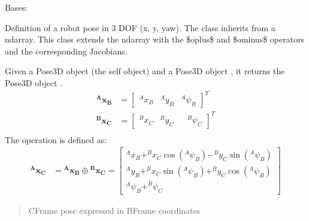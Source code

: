 \documentclass[letterpaper,10pt,english]{sphinxmanual}
\begin{document}
\begin{fulllineitems}
\label{\detokenize{compounding:Pose3D.Pose3D}}
\pysigstartsignatures
{}
\pysigstopsignatures
\sphinxAtStartPar
Bases: 

\sphinxAtStartPar
Definition of a robot pose in 3 DOF (x, y, yaw). The class inherits from a ndarray.
This class extends the ndarray with the \$oplus\$ and \$ominus\$ operators and the corresponding Jacobians.

\begin{fulllineitems}
\label{\detokenize{compounding:Pose3D.Pose3D.oplus}}
\pysigstartsignatures
{}
\pysigstopsignatures
\sphinxAtStartPar
Given a Pose3D object  (the self object) and a Pose3D object , it returns the Pose3D object .
\begin{equation*}
\begin{split}\mathbf{{^A}x_B} &= \begin{bmatrix} ^Ax_B & ^Ay_B & ^A\psi_B \end{bmatrix}^T \\
\mathbf{{^B}x_C} &= \begin{bmatrix} ^Bx_C & ^By_C & & ^B\psi_C \end{bmatrix}^T \\\end{split}
\end{equation*}
\sphinxAtStartPar
The operation is defined as:
\begin{equation}\label{equation:compounding:eq-oplus3dof}
\begin{split}\mathbf{{^A}x_C} &= \mathbf{{^A}x_B} \oplus \mathbf{{^B}x_C} =
\begin{bmatrix}
    ^Ax_B + ^Bx_C  \cos(^A\psi_B) - ^By_C  \sin(^A\psi_B) \\
    ^Ay_B + ^Bx_C  \sin(^A\psi_B) + ^By_C  \cos(^A\psi_B) \\
    ^A\psi_B + ^B\psi_C
\end{bmatrix}\end{split}
\end{equation}\begin{quote}\begin{description}
\sphinxAtStartPar
{} \textendash{} C\sphinxhyphen{}Frame pose expressed in B\sphinxhyphen{}Frame coordinates


\end{description}
\end{quote}
\end{fulllineitems}
\end{fulllineitems}
\end{document}
